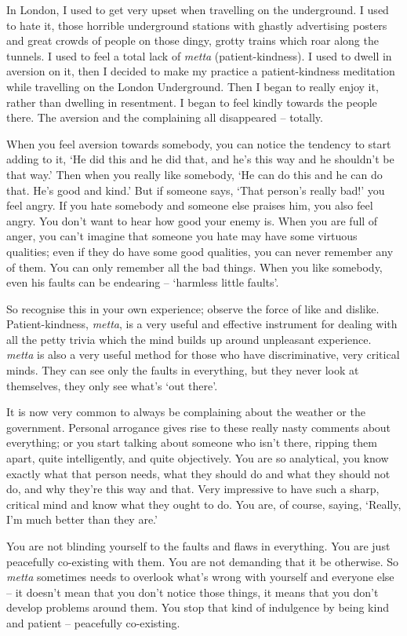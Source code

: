 In London, I used to get very upset when travelling on the underground. I used to hate it, those horrible underground stations with ghastly advertising posters and great crowds of people on those dingy, grotty trains which roar along the tunnels. I used to feel a total lack of \textit{metta} (patient-kindness). I used to dwell in aversion on it, then I decided to make my practice a patient-kindness meditation while travelling on the London Underground. Then I began to really enjoy it, rather than dwelling in resentment. I began to feel kindly towards the people there. The aversion and the complaining all disappeared -- totally.

When you feel aversion towards somebody, you can notice the tendency to start adding to it, `He did this and he did that, and he's this way and he shouldn't be that way.' Then when you really like somebody, `He can do this and he can do that. He's good and kind.' But if someone says, `That person's really bad!' you feel angry. If you hate somebody and someone else praises him, you also feel angry. You don't want to hear how good your enemy is. When you are full of anger, you can't imagine that someone you hate may have some virtuous qualities; even if they do have some good qualities, you can never remember any of them. You can only remember all the bad things. When you like somebody, even his faults can be endearing -- `harmless little faults'.

So recognise this in your own experience; observe the force of like and dislike. Patient-kindness, \textit{metta}, is a very useful and effective instrument for dealing with all the petty trivia which the mind builds up around unpleasant experience. \textit{metta} is also a very useful method for those who have discriminative, very critical minds. They can see only the faults in everything, but they never look at themselves, they only see what's `out there'.

It is now very common to always be complaining about the weather or the government. Personal arrogance gives rise to these really nasty comments about everything; or you start talking about someone who isn't there, ripping them apart, quite intelligently, and quite objectively. You are so analytical, you know exactly what that person needs, what they should do and what they should not do, and why they're this way and that. Very impressive to have such a sharp, critical mind and know what they ought to do. You are, of course, saying, `Really, I'm much better than they are.'

You are not blinding yourself to the faults and flaws in everything. You are just peacefully co-existing with them. You are not demanding that it be otherwise. So \textit{metta} sometimes needs to overlook what's wrong with yourself and everyone else -- it doesn't mean that you don't notice those things, it means that you don't develop problems around them. You stop that kind of indulgence by being kind and patient -- peacefully co-existing.


